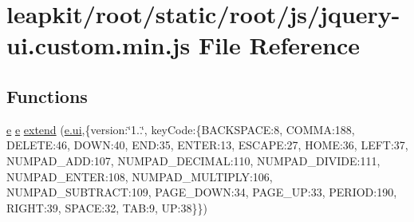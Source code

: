 \hypertarget{root_2static_2root_2js_2jquery-ui_8custom_8min_8js}{\section{leapkit/root/static/root/js/jquery-\/ui.custom.\-min.\-js File Reference}
\label{root_2static_2root_2js_2jquery-ui_8custom_8min_8js}
}
\subsection*{Functions}
\begin{DoxyCompactItemize}
\item 
\hyperlink{static_2root_2js_2jquery-ui_8custom_8min_8js_abea95a4e94bc6f4151d5683d4c12c3f4}{e} \hyperlink{static_2root_2js_2jquery-ui_8custom_8min_8js_abea95a4e94bc6f4151d5683d4c12c3f4}{e} \hyperlink{root_2static_2root_2js_2jquery-ui_8custom_8min_8js_acc7e6cb2b5394dabfe11ba6b8cdf9a30}{extend} (\hyperlink{static_2root_2js_2jquery-ui_8custom_8min_8js_a8ebc3a47bff7b1c2623695f3db4c0761}{e.\-ui},\{version\-:\char`\"{}1..\char`\"{}, key\-Code\-:\{B\-A\-C\-K\-S\-P\-A\-C\-E\-:8, C\-O\-M\-M\-A\-:188, D\-E\-L\-E\-T\-E\-:46, D\-O\-W\-N\-:40, E\-N\-D\-:35, E\-N\-T\-E\-R\-:13, E\-S\-C\-A\-P\-E\-:27, H\-O\-M\-E\-:36, L\-E\-F\-T\-:37, N\-U\-M\-P\-A\-D\-\_\-\-A\-D\-D\-:107, N\-U\-M\-P\-A\-D\-\_\-\-D\-E\-C\-I\-M\-A\-L\-:110, N\-U\-M\-P\-A\-D\-\_\-\-D\-I\-V\-I\-D\-E\-:111, N\-U\-M\-P\-A\-D\-\_\-\-E\-N\-T\-E\-R\-:108, N\-U\-M\-P\-A\-D\-\_\-\-M\-U\-L\-T\-I\-P\-L\-Y\-:106, N\-U\-M\-P\-A\-D\-\_\-\-S\-U\-B\-T\-R\-A\-C\-T\-:109, P\-A\-G\-E\-\_\-\-D\-O\-W\-N\-:34, P\-A\-G\-E\-\_\-\-U\-P\-:33, P\-E\-R\-I\-O\-D\-:190, R\-I\-G\-H\-T\-:39, S\-P\-A\-C\-E\-:32, T\-A\-B\-:9, U\-P\-:38\}\})
\item 

\end{DoxyCompactItemize}
